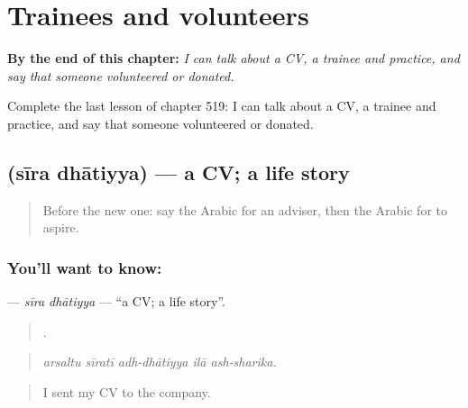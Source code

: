 
\chapter{Trainees and volunteers}
\label{ch:ar-trainees-and-volunteers}

\begin{chapteropening}
\textbf{By the end of this chapter:} \emph{I can talk about a CV, a trainee and practice, and say that someone volunteered or donated.}

Complete the last lesson of chapter 519: I can talk about a CV, a trainee and practice, and say that someone volunteered or donated.
\end{chapteropening}

\section[\texorpdfstring{\ar{سيرة} \ar{ذاتية} (sīra dhātiyya)}{سيرة ذاتية (sīra dhātiyya)}]{  (sīra dhātiyya) — a CV; a life story}

\label{lesson:AR-C519-sira-dhatiyya}



\begin{quote}
Before the new one: say the Arabic for an adviser, then the Arabic for to aspire.
\end{quote}

\subsection*{You'll want to know:  }
\textbf{ } — \emph{sīra dhātiyya} — \textquotedblleft{}a CV; a life story\textquotedblright{}.

\begin{quote}
    .
\end{quote}

\begin{quote}
\emph{arsaltu sīratī adh-dhātiyya ilā ash-sharika.}
\end{quote}

\begin{quote}
I sent my CV to the company.
\end{quote}

